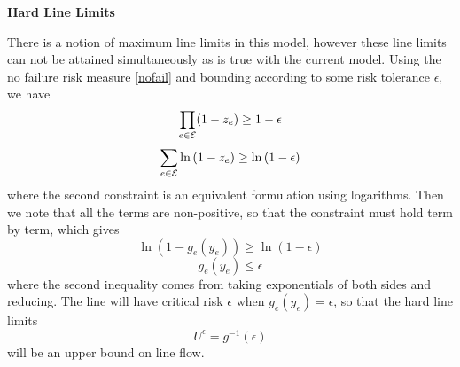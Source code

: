 \textbf{Hard Line Limits}

There is a notion of maximum line limits in this model, however these line limits can not be attained simultaneously as is true with the current model.  Using the no failure risk measure \ref{nofail} and bounding according to some risk tolerance $\epsilon$, we have
\[ \prod_{e \in \mathcal{E}} (1-z_e) \geq 1 - \epsilon \]
\[ \sum_{e \in \mathcal{E}} \ln \left( 1-z_e \right) \geq \ln \left(1-\epsilon \right) \]
where the second constraint is an equivalent formulation using logarithms.
Then we note that all the terms are non-positive, so that the constraint must hold term by term, which gives
\[ \ln \left( 1 - g_e(y_e)  \right) \geq \ln \left( 1- \epsilon \right) \]
\begin{equation*}
g_e(y_e) \leq \epsilon
\end{equation*}
where the second inequality comes from taking exponentials of both sides and reducing. The line will have critical risk $\epsilon$ when $g_e(y_e) = \epsilon$, so that the hard line limits
\begin{equation} \label{hardline}
U^{\epsilon} = g^{-1}\left(\epsilon\right)
\end{equation}
will be an upper bound on line flow.
